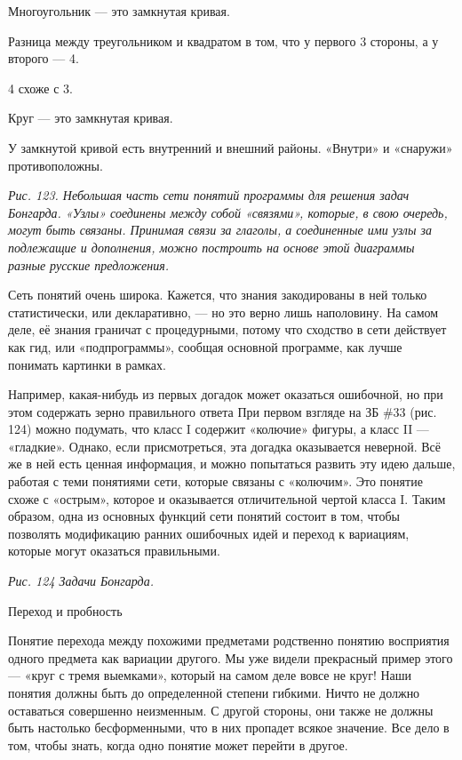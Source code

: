 \documentclass[../main.tex]{subfiles}
\begin{document}
Многоугольник --- это замкнутая кривая.

Разница между треугольником и квадратом в том, что у первого 3 стороны, а у второго --- 4.

4 схоже с 3.

Круг --- это замкнутая кривая.

У замкнутой кривой есть внутренний и внешний районы. «Внутри» и «снаружи» противоположны.

\emph{Рис. 123. Небольшая часть сети понятий программы для решения задач Бонгарда. «Узлы» соединены между собой «связями», которые, в свою очередь, могут быть связаны. Принимая связи за глаголы, а соединенные ими узлы за подлежащие и дополнения, можно построить на основе этой диаграммы разные русские предложения.}

Сеть понятий очень широка. Кажется, что знания закодированы в ней только статистически, или декларативно, --- но это верно лишь наполовину. На самом деле, её знания граничат с процедурными, потому что сходство в сети действует как гид, или «подпрограммы», сообщая основной программе, как лучше понимать картинки в рамках.

Например, какая-нибудь из первых догадок может оказаться ошибочной, но при этом содержать зерно правильного ответа При первом взгляде на ЗБ \#33 (рис. 124) можно подумать, что класс I содержит «колючие» фигуры, а класс II --- «гладкие». Однако, если присмотреться, эта догадка оказывается неверной. Всё же в ней есть ценная информация, и можно попытаться развить эту идею дальше, работая с теми понятиями сети, которые связаны с «колючим». Это понятие схоже с «острым», которое и оказывается отличительной чертой класса I. Таким образом, одна из основных функций сети понятий состоит в том, чтобы позволять модификацию ранних ошибочных идей и переход к вариациям, которые могут оказаться правильными.

\emph{Рис. 124 Задачи Бонгарда.}

Переход и пробность

Понятие перехода между похожими предметами родственно понятию восприятия одного предмета как вариации другого. Мы уже видели прекрасный пример этого --- «круг с тремя выемками», который на самом деле вовсе не круг! Наши понятия должны быть до определенной степени гибкими. Ничто не должно оставаться совершенно неизменным. С другой стороны, они также не должны быть настолько бесформенными, что в них пропадет всякое значение. Все дело в том, чтобы знать, когда одно понятие может перейти в другое.
\end{document}
